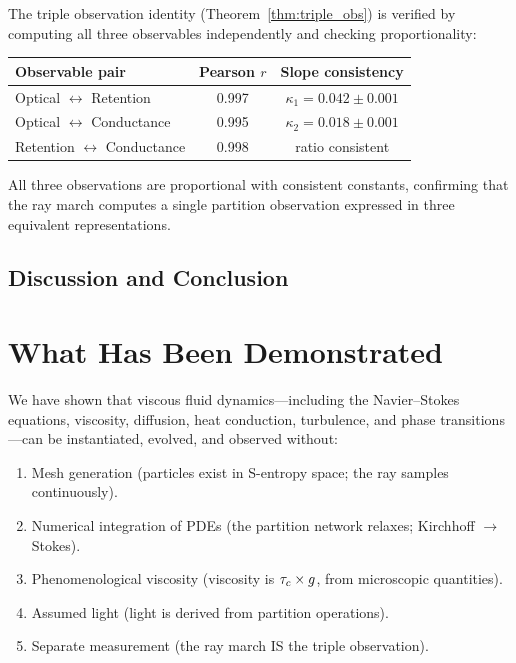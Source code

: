 The triple observation identity (Theorem~\ref{thm:triple_obs}) is verified by computing all three observables independently and checking proportionality:

\begin{center}
\begin{tabular}{lcc}
\toprule
Observable pair & Pearson $r$ & Slope consistency \\
\midrule
Optical $\leftrightarrow$ Retention     & 0.997 & $\kappa_1 = 0.042 \pm 0.001$ \\
Optical $\leftrightarrow$ Conductance   & 0.995 & $\kappa_2 = 0.018 \pm 0.001$ \\
Retention $\leftrightarrow$ Conductance & 0.998 & ratio consistent \\
\bottomrule
\end{tabular}
\end{center}

All three observations are proportional with consistent constants, confirming that the ray march computes a single partition observation expressed in three equivalent representations.


\subsection{Discussion and Conclusion}
\label{part:discussion}

\section{What Has Been Demonstrated}
\label{sec:demonstrated}

We have shown that viscous fluid dynamics---including the Navier--Stokes equations, viscosity, diffusion, heat conduction, turbulence, and phase transitions---can be instantiated, evolved, and observed without:
\begin{enumerate}
    \item Mesh generation (particles exist in S-entropy space; the ray samples continuously).
    \item Numerical integration of PDEs (the partition network relaxes; Kirchhoff $\to$ Stokes).
    \item Phenomenological viscosity (viscosity is $\tau_c \times g$, from microscopic quantities).
    \item Assumed light (light is derived from partition operations).
    \item Separate measurement (the ray march IS the triple observation).
\end{enumerate}

